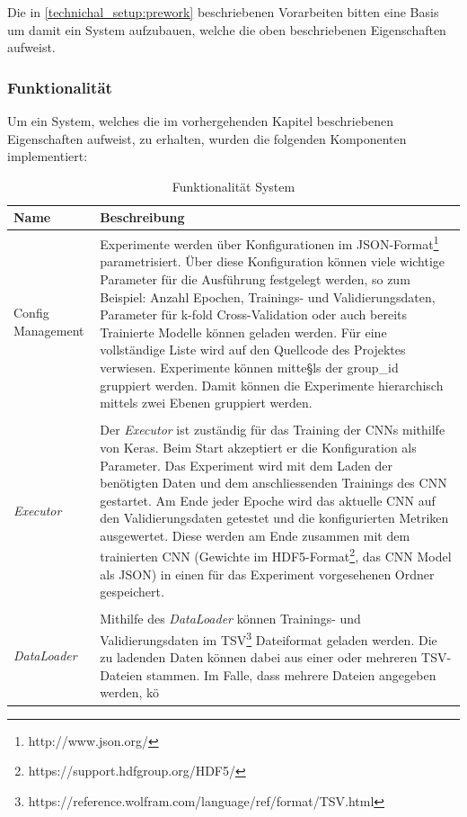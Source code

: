 Die in \ref{technichal_setup:prework} beschriebenen Vorarbeiten bitten eine Basis um damit ein System aufzubauen, welche die oben beschriebenen Eigenschaften aufweist.
\subsubsection{Funktionalität}
\label{technical_setup:functionality}
Um ein System, welches die im vorhergehenden Kapitel beschriebenen Eigenschaften aufweist, zu erhalten, wurden die folgenden Komponenten implementiert:

\begin{table}
	\begin{adjustbox}{max width=\columnwidth}
		\begin{tabular}{|p{4cm}|p{14cm}|}
			\toprule
			Name & Beschreibung\\ \midrule
			Config Management & Experimente werden über Konfigurationen im JSON-Format\footnote{http://www.json.org/} parametrisiert. Über diese Konfiguration können viele wichtige Parameter für die Ausführung festgelegt werden, so zum Beispiel: Anzahl Epochen, Trainings- und Validierungsdaten, Parameter für k-fold Cross-Validation oder auch bereits Trainierte Modelle können geladen werden. Für eine vollständige Liste wird auf den Quellcode des Projektes verwiesen. Experimente können mitte§ls der group{\_}id gruppiert werden. Damit können die Experimente hierarchisch mittels zwei Ebenen gruppiert werden.\\
			&\\
			\emph{Executor} & Der \emph{Executor} ist zuständig für das Training der CNNs mithilfe von Keras. Beim Start akzeptiert er die Konfiguration als Parameter. Das Experiment wird mit dem Laden der benötigten Daten und dem anschliessenden Trainings des CNN gestartet. Am Ende jeder Epoche wird das aktuelle CNN auf den Validierungsdaten getestet und die konfigurierten Metriken ausgewertet. Diese werden am Ende zusammen mit dem trainierten CNN (Gewichte im HDF5-Format\footnote{https://support.hdfgroup.org/HDF5/}, das CNN Model als JSON) in einen für das Experiment vorgesehenen Ordner gespeichert. \\
			&\\
			\emph{DataLoader} & Mithilfe des \emph{DataLoader} können Trainings- und Validierungsdaten im TSV\footnote{https://reference.wolfram.com/language/ref/format/TSV.html} Dateiformat geladen werden. Die zu ladenden Daten können dabei aus einer oder mehreren TSV-Dateien stammen. Im Falle, dass mehrere Dateien angegeben werden, kö\\
			\bottomrule
		\end{tabular}
	\end{adjustbox}
	\caption{Funktionalität System}
\end{table}

